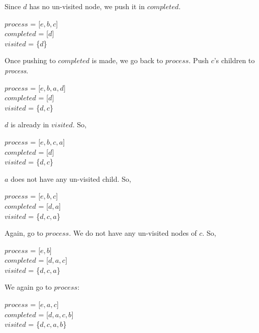 \documentclass[addpoints]{exam}
\begin{document}
\begin{questions}
\begin{parts}
\begin{solution}
    	Since $d$ has no un-visited node, we push it in $completed$.\\
    	\begin{center}
    		$process$ = [$e, b, c$]\\
    		$completed$ = [$d$]\\
    		$visited$ = \{$d$\}\\
    	\end{center}
    	Once pushing to $completed$ is made, we go back to $process$. Push $c$'s children to {\it process}. \\
    	\begin{center}
    		$process$ = [$e, b, a, d$]\\
    		$completed$ = [$d$]\\
    		$visited$ = \{$d, c$\}\\
    	\end{center}
    	$d$ is already in $visited$. So,\\
    	\begin{center}
    		$process$ = [$e, b, c, a$]\\
    		$completed$ = [$d$]\\
    		$visited$ = \{$d, c$\}\\
    	\end{center}
    	$a$ does not have any un-visited child. So,\\
    	\begin{center}
    		$process$ = [$e, b, c$]\\
    		$completed$ = [$d, a$]\\
    		$visited$ = \{$d, c, a$\}\\
    	\end{center}
    	Again, go to $process$. We do not have any un-visited nodes of $c$. So, \\
    	\begin{center}
    		$process$ = [$e, b$]\\
    		$completed$ = [$d, a, c$]\\
    		$visited$ = \{$d, c, a$\}\\
    	\end{center}
    	We again go to $process$:\\
    	\begin{center}
    		$process$ = [$e, a, c$]\\
    		$completed$ = [$d, a, c, b$]\\
    		$visited$ = \{$d, c, a, b$\}\\
    	\end{center}

\end{solution}
\end{parts}
\end{questions}
\end{document}
